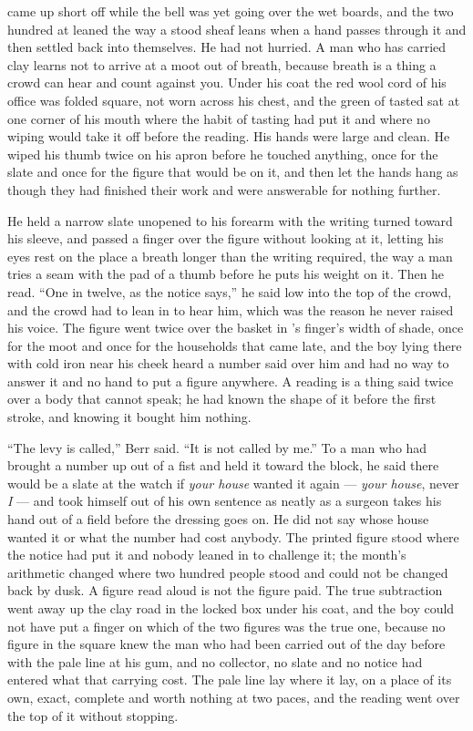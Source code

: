  came up short off  while the bell was yet going over the wet boards, and the two hundred at  leaned the way a stood sheaf leans when a hand passes through it and then settled back into themselves. He had not hurried. A man who has carried clay learns not to arrive at a moot out of breath, because breath is a thing a crowd can hear and count against you. Under his coat the red wool cord of his office was folded square, not worn across his chest, and the green of tasted  sat at one corner of his mouth where the habit of tasting had put it and where no wiping would take it off before the reading. His hands were large and clean. He wiped his thumb twice on his apron before he touched anything, once for the slate and once for the figure that would be on it, and then let the hands hang as though they had finished their work and were answerable for nothing further.

He held a narrow slate unopened to his forearm with the writing turned toward his sleeve, and passed a finger over the figure without looking at it, letting his eyes rest on the place a breath longer than the writing required, the way a man tries a seam with the pad of a thumb before he puts his weight on it. Then he read. “One in twelve, as the notice says,” he said low into the top of the crowd, and the crowd had to lean in to hear him, which was the reason he never raised his voice. The figure went twice over the basket in 's finger's width of shade, once for the moot and once for the households that came late, and the boy lying there with cold iron near his cheek heard a number said over him and had no way to answer it and no hand to put a figure anywhere. A reading is a thing said twice over a body that cannot speak; he had known the shape of it before the first stroke, and knowing it bought him nothing.

“The levy is called,” Berr said. “It is not called by me.” To a man who had brought a number up out of a fist and held it toward the block, he said there would be a slate at the watch if \emph{your house} wanted it again --- \emph{your house}, never \emph{I} --- and took himself out of his own sentence as neatly as a surgeon takes his hand out of a field before the dressing goes on. He did not say whose house wanted it or what the number had cost anybody. The printed figure stood where the notice had put it and nobody leaned in to challenge it; the month's arithmetic changed where two hundred people stood and could not be changed back by dusk. A figure read aloud is not the figure paid. The true subtraction went away up the clay road in the locked box under his coat, and the boy could not have put a finger on which of the two figures was the true one, because no figure in the square knew the man who had been carried out of  the day before with the pale line at his gum, and no collector, no slate and no notice had entered what that carrying cost. The pale line lay where it lay, on a place of its own, exact, complete and worth nothing at two paces, and the reading went over the top of it without stopping.

